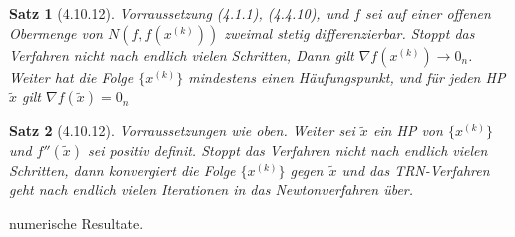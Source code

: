 \documentclass[ngerman,halfparskip]{scrartcl}
\newtheorem*{satz}{Satz}
\theoremstyle{definition}
\begin{document}
\begin{satz}[4.10.12]
Vorraussetzung (4.1.1), (4.4.10), und $f$ sei auf einer offenen Obermenge von $N(f,f(x^{(k)}))$ zweimal stetig differenzierbar. Stoppt das Verfahren nicht nach endlich vielen Schritten, Dann gilt $\nabla f(x^{(k)})\to 0_n$.\\
Weiter hat die Folge $\{x^{(k)}\}$ mindestens einen Häufungspunkt, und für jeden HP $\tilde x$ gilt $\nabla f(\tilde x)=0_n$
\end{satz}

\begin{satz}[4.10.12]
Vorraussetzungen wie oben. Weiter sei $\tilde x$ ein HP von $\{x^{(k)}\}$ und $f''(\tilde x)$ sei positiv definit. Stoppt das Verfahren nicht nach endlich vielen Schritten, dann konvergiert die Folge $\{x^{(k)}\}$ gegen $\tilde x$ und das TRN-Verfahren geht nach endlich vielen Iterationen in das Newtonverfahren über.
\end{satz}

numerische Resultate.
\end{document}
